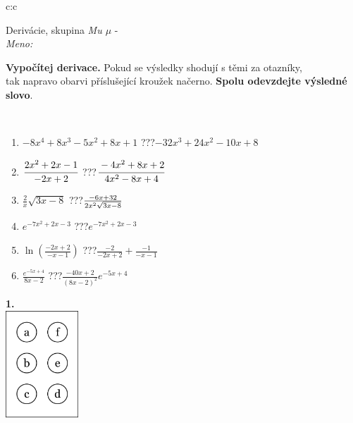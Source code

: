 \documentclass[10pt]{report}
\begin{document}
\begin{tabular}{c:c}
\begin{minipage}[c][104.5mm][t]{0.5\linewidth}
\begin{center}
\vspace{7mm}
{\huge Derivácie, skupina \textit{Mu $\mu$} -}\\[5mm]
\textit{Meno:}\phantom{xxxxxxxxxxxxxxxxxxxxxxxxxxxxxxxxxxxxxxxxxxxxxxxxxxxxxxxxxxxxxxxxx}\\[5mm]
\begin{minipage}{0.95\linewidth}
\begin{center}
\textbf{Vypočítej derivace.} Pokud se výsledky shodují s těmi za otazníky,\\tak napravo obarvi příslušející kroužek načerno. \textbf{Spolu odevzdejte výsledné slovo}.
\end{center}
\end{minipage}
\\[1mm]
\begin{minipage}{0.79\linewidth}
\begin{center}
\begin{varwidth}{\linewidth}
\begin{enumerate}
\normalsize
\item $-8x^4+8x^3-5x^2+8x+1$\quad \dotfill\; ???\;\dotfill \quad $-32x^3+24x^2-10x+8$
\item $\cfrac{2x^2+2x-1}{-2x+2}$\quad \dotfill\; ???\;\dotfill \quad $\cfrac{-4x^2+8x+2}{4x^2-8x+4}$
\item $\frac{2}{x}\sqrt{3x-8}$\quad \dotfill\; ???\;\dotfill \quad $\frac{-6x+32}{2x^2 \sqrt{\smash[b]{3x-8}}}$
\item $e^{-7x^2+2x-3}$\quad \dotfill\; ???\;\dotfill \quad $e^{-7x^2+2x-3}$
\item $\ln{\left(\frac{-2x+2}{-x-1}\right)}$\quad \dotfill\; ???\;\dotfill \quad $\frac{-2}{-2x+2}+\frac{-1}{-x-1}$
\item $\frac{e^{-5x+4}}{8x-2}$\quad \dotfill\; ???\;\dotfill \quad $\frac{-40x+2}{(8x-2)^2}e^{-5x+4}$
\end{enumerate}
\end{varwidth}
\end{center}
\end{minipage}
\begin{minipage}{0.20\linewidth}
\begin{center}
{\Huge\bfseries 1.} \\[2mm]
\includegraphics[height=40mm]{../images/braille.png}

\end{center}
\end{minipage}
\end{center}
\end{minipage}
\end{tabular}
\end{document}
